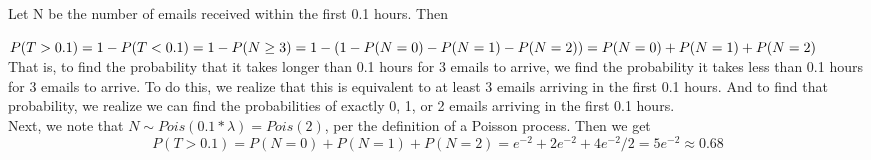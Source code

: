 Let N be the number of emails received within the first 0.1 hours. Then 

\(P(T>0.1) = 1 - P(T<0.1) = 1 - P(N \geq 3) = \newline 1 - (1 - P(N=0) - P(N=1) - P(N=2)) = P(N=0)+P(N=1)+P(N=2)\)\\

That is, to find the probability that it takes longer than 0.1 hours for 3 emails to arrive, we find the probability it takes less than 0.1 hours for 3 emails to arrive. To do this, we realize that this is equivalent to at least 3 emails arriving in the first 0.1 hours. And to find that probability, we realize we can find the probabilities of exactly 0, 1, or 2 emails arriving in the first 0.1 hours.\\

Next, we note that \(N \sim Pois(0.1*\lambda) = Pois(2)\), per the definition of a Poisson process. Then we get
\[P(T>0.1) = P(N=0)+P(N=1)+P(N=2) = e^{-2} + 2e^{-2} + 4e^{-2}/2 = 5e^{-2} \approx 0.68\]
